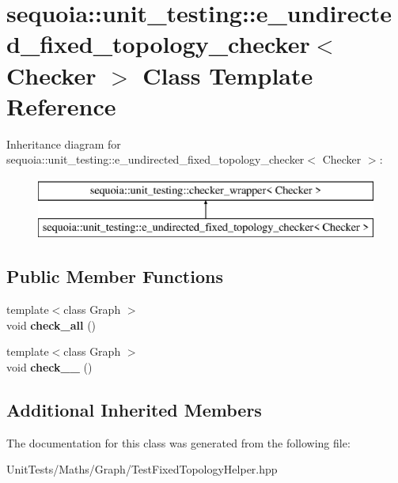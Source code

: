 \hypertarget{classsequoia_1_1unit__testing_1_1e__undirected__fixed__topology__checker}{}\section{sequoia\+::unit\+\_\+testing\+::e\+\_\+undirected\+\_\+fixed\+\_\+topology\+\_\+checker$<$ Checker $>$ Class Template Reference}
\label{classsequoia_1_1unit__testing_1_1e__undirected__fixed__topology__checker}
Inheritance diagram for sequoia\+::unit\+\_\+testing\+::e\+\_\+undirected\+\_\+fixed\+\_\+topology\+\_\+checker$<$ Checker $>$\+:\begin{figure}[H]
\begin{center}
\leavevmode
\includegraphics[height=2.000000cm]{classsequoia_1_1unit__testing_1_1e__undirected__fixed__topology__checker}
\end{center}
\end{figure}
\subsection*{Public Member Functions}
\begin{DoxyCompactItemize}
\item 
\mbox{\label{classsequoia_1_1unit__testing_1_1e__undirected__fixed__topology__checker_ac1123a14f6b1f0e758af6eff4baf070a}} 
{\footnotesize template$<$class Graph $>$ }\\void {\bfseries check\+\_\+all} ()
\item 
\mbox{\label{classsequoia_1_1unit__testing_1_1e__undirected__fixed__topology__checker_adb4caec2b4a14be45a8bd709f20576f1}} 
{\footnotesize template$<$class Graph $>$ }\\void {\bfseries check\+\_\+\_} ()
\end{DoxyCompactItemize}
\subsection*{Additional Inherited Members}


The documentation for this class was generated from the following file\+:\begin{DoxyCompactItemize}
\item 
Unit\+Tests/\+Maths/\+Graph/Test\+Fixed\+Topology\+Helper.\+hpp\end{DoxyCompactItemize}
